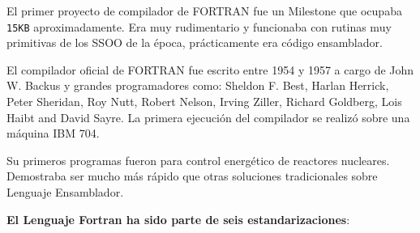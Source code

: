 El primer proyecto de compilador de FORTRAN fue un Milestone que
ocupaba
\texttt{15KB} aproximadamente. Era muy rudimentario y funcionaba con rutinas muy
primitivas de los SSOO de la época, prácticamente era código ensamblador.

El compilador oficial de FORTRAN fue escrito entre 1954 y 1957 a cargo de John
W. Backus y grandes programadores como: Sheldon F. Best, Harlan Herrick, Peter
Sheridan, Roy Nutt, Robert Nelson, Irving Ziller, Richard Goldberg, Lois Haibt
and David Sayre. La primera ejecución del compilador se realizó sobre una
máquina IBM 704.
 
Su primeros programas fueron para control energético de reactores nucleares.
Demostraba ser mucho más rápido que otras soluciones tradicionales sobre
Lenguaje Ensamblador.




\textbf{El Lenguaje Fortran ha sido parte de seis estandarizaciones}:

